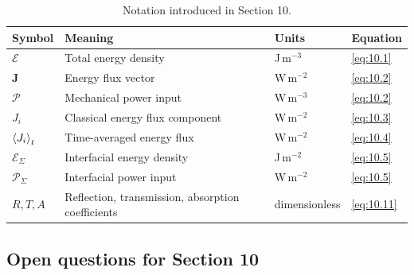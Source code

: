 \begin{table}[htbp]
\centering
\small
\caption{Notation introduced in Section 10.}
\label{tab:notation-sec10}
\begin{tabularx}{\textwidth}{@{}p{1.8cm}X p{2.2cm}p{2.1cm}@{}}
\toprule
\textbf{Symbol} & \textbf{Meaning} & \textbf{Units} & \textbf{Equation} \\
\midrule
$\mathcal{E}$ & Total energy density & J\,m$^{-3}$ & \eqref{eq:10.1} \\
$\bm{J}$ & Energy flux vector & W\,m$^{-2}$ & \eqref{eq:10.2} \\
$\mathcal{P}$ & Mechanical power input & W\,m$^{-3}$ & \eqref{eq:10.2} \\
$J_i$ & Classical energy flux component & W\,m$^{-2}$ & \eqref{eq:10.3} \\
$\left\langle J_i \right\rangle_t$ & Time-averaged energy flux & W\,m$^{-2}$ & \eqref{eq:10.4} \\
$\mathcal{E}_\Sigma$ & Interfacial energy density & J\,m$^{-2}$ & \eqref{eq:10.5} \\
$\mathcal{P}_\Sigma$ & Interfacial power input & W\,m$^{-2}$ & \eqref{eq:10.5} \\
$R, T, A$ & Reflection, transmission, absorption coefficients & dimensionless & \eqref{eq:10.11} \\
\bottomrule
\end{tabularx}
\end{table}

\subsection{Open questions for Section 10}

